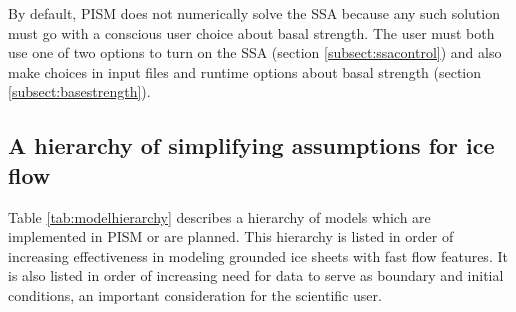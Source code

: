 \documentclass[titlepage,letterpaper,final]{scrartcl}
\begin{document}
By default, PISM does not numerically solve the SSA because any such solution must go with a conscious user choice about basal strength.  The user must both use one of two options to turn on the SSA (section \ref{subsect:ssacontrol}) and also make choices in input files and runtime options about basal strength (section \ref{subsect:basestrength}).


\subsection{A hierarchy of simplifying assumptions for ice flow}\label{sec:model-hierarchy}   Table \ref{tab:modelhierarchy} describes a hierarchy of models which are implemented in PISM or are planned.  This hierarchy is listed in order of increasing effectiveness in modeling grounded ice sheets with fast flow features.  It is also listed in order of increasing need for data to serve as boundary and initial conditions, an important consideration for the scientific user.
\end{document}
